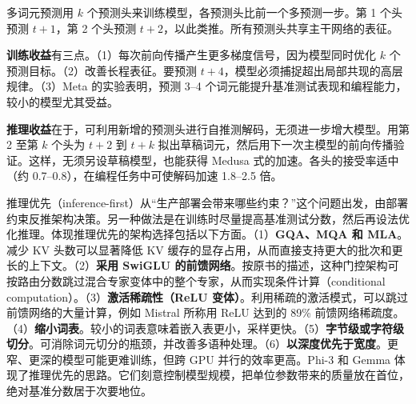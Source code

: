 \begin{interview}
多词元预测用 $k$ 个预测头来训练模型，各预测头比前一个多预测一步。第 1 个头预测 $t+1$，第 2 个头预测 $t+2$，以此类推。所有预测头共享主干网络的表征。

\textbf{训练收益}有三点。（1）每次前向传播产生更多梯度信号，因为模型同时优化 $k$ 个预测目标。（2）改善长程表征。要预测 $t+4$，模型必须捕捉超出局部共现的高层规律。（3）Meta 的实验表明，预测 3–4 个词元能提升基准测试表现和编程能力，较小的模型尤其受益。

\textbf{推理收益}在于，可利用新增的预测头进行自推测解码，无须进一步增大模型。用第 2 至第 $k$ 个头为 $t+2$ 到 $t+k$ 拟出草稿词元，然后用下一次主模型的前向传播验证。这样，无须另设草稿模型，也能获得 Medusa 式的加速。各头的接受率适中（约 0.7–0.8），在编程任务中可使解码加速 1.8–2.5 倍。

推理优先（inference-first）从“生产部署会带来哪些约束？”这个问题出发，由部署约束反推架构决策。另一种做法是在训练时尽量提高基准测试分数，然后再设法优化推理。体现推理优先的架构选择包括以下方面。（1）\textbf{GQA、MQA 和 MLA}。减少 KV 头数可以显著降低 KV 缓存的显存占用，从而直接支持更大的批次和更长的上下文。（2）\textbf{采用 SwiGLU 的前馈网络}。按原书的描述，这种门控架构可按路由分数跳过混合专家变体中的整个专家，从而实现条件计算（conditional computation）。（3）\textbf{激活稀疏性（ReLU 变体）}。利用稀疏的激活模式，可以跳过前馈网络的大量计算，例如 Mistral 所称用 ReLU 达到的 89\% 前馈网络稀疏度。（4）\textbf{缩小词表}。较小的词表意味着嵌入表更小，采样更快。（5）\textbf{字节级或字符级切分}。可消除词元切分的瓶颈，并改善多语种处理。（6）\textbf{以深度优先于宽度}。更窄、更深的模型可能更难训练，但跨 GPU 并行的效率更高。Phi-3 和 Gemma 体现了推理优先的思路。它们刻意控制模型规模，把单位参数带来的质量放在首位，绝对基准分数居于次要地位。
\end{interview}
